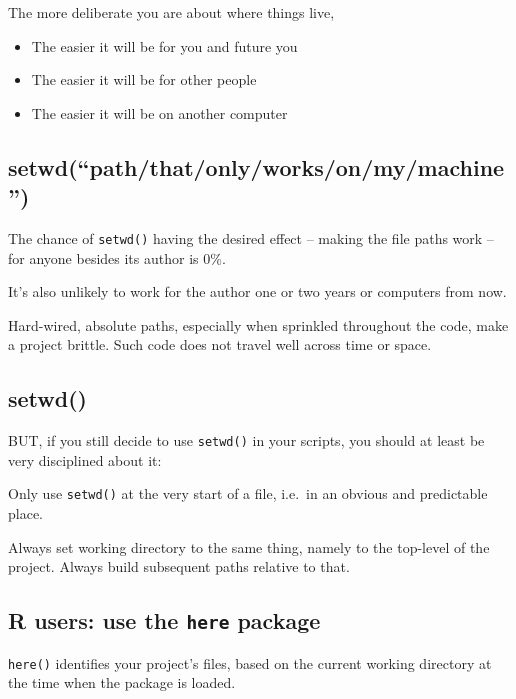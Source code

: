 \documentclass[
  letterpaper,
  DIV=11,
  numbers=noendperiod]{scrreprt}
\providecommand{\tightlist}{%
  \setlength{\itemsep}{0pt}\setlength{\parskip}{0pt}}
\begin{document}
The more deliberate you are about where things live,

\begin{itemize}
\tightlist
\item
  The easier it will be for you and future you
\item
  The easier it will be for other people
\item
  The easier it will be on another computer
\end{itemize}

\hypertarget{setwdpaththatonlyworksonmymachine}{%
\subsection{setwd(``path/that/only/works/on/my/machine'')}\label{setwdpaththatonlyworksonmymachine}}

The chance of \texttt{setwd()} having the desired effect -- making the
file paths work -- for anyone besides its author is 0\%.

It's also unlikely to work for the author one or two years or computers
from now.

Hard-wired, absolute paths, especially when sprinkled throughout the
code, make a project brittle. Such code does not travel well across time
or space.

\hypertarget{setwd}{%
\subsection{setwd()}\label{setwd}}

BUT, if you still decide to use \texttt{setwd()} in your scripts, you
should at least be very disciplined about it:

Only use \texttt{setwd()} at the very start of a file, i.e.~in an
obvious and predictable place.

Always set working directory to the same thing, namely to the top-level
of the project. Always build subsequent paths relative to that.

\hypertarget{r-users-use-the-here-package}{%
\subsection{\texorpdfstring{R users: use the \texttt{here}
package}{R users: use the here package}}\label{r-users-use-the-here-package}}

\texttt{here()} identifies your project's files, based on the current
working directory at the time when the package is loaded.
\end{document}
